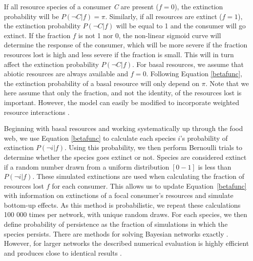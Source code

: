 \documentclass[12pt]{article}
\begin{document}
\begin{spacing}{2.0}
		If all resource species of a consumer \textit{C} are present ($f = 0$), the extinction probability will be $P(\lnot C|f) = \pi$. 
		Similarly, if all resources are extinct ($f = 1$), the extinction probability $P(\lnot C|f)$ will be equal to 1 and the consumer will go extinct.
		If the fraction $f$ is not 1 nor 0, the non-linear sigmoid curve will determine the response of the consumer, which will be more severe if the fraction resources lost is high and less severe if the fraction is small. This will in turn affect the extinction probability $P(\lnot C|f)$.
		For basal resources, we assume that abiotic resources are always available and $f=0$. 
		Following Equation \ref{betafunc}, the extinction probability of a basal resource will only depend on $\pi$.
		Note that we here assume that only the fraction, and not the identity, of the resources lost is important. 
		However, the model can easily be modified to incorporate weighted resource interactions \citep[see][]{Eklof2013}.
		
		
        Beginning with basal resources and working systematically up through the food web, we use Equation \ref{betafunc} to calculate each species $i$'s probability of extinction $P(\lnot i|f)$.
        Using this probability, we then perform Bernoulli trials to determine whether the species goes extinct or not. 
        Species are considered extinct if a random number drawn from a uniform distribution $[0-1]$ is less than $P(\lnot i|f)$.
        These simulated extinctions are used when calculating the fraction of resources lost $f$ for each consumer.
        This allows us to update Equation~\ref{betafunc} with information on extinctions of a focal consumer's resources and simulate bottom-up effects. As this method is probabilistic, we repeat these calculations 100 000 times per network, with unique random draws.
	    For each species, we then define probability of persistence as the fraction of simulations in which the species persists. There are methods for solving Bayesian networks exactly \citep{Eklof2013}.
	    However, for larger networks the described numerical evaluation is highly efficient and produces close to identical results \citep{Haussler2020}.
		

\end{spacing}
\end{document}
